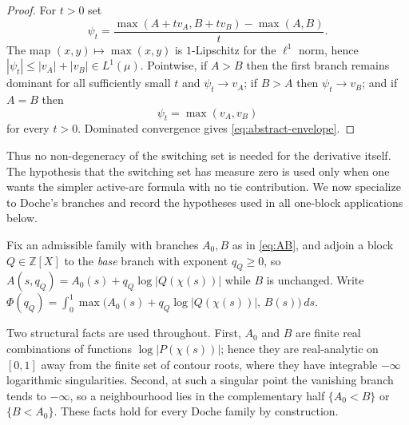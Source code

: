 \documentclass[11pt,reqno]{amsart}
\theoremstyle{plain}
\theoremstyle{definition}
\theoremstyle{remark}
\newcommand{\Z}{\mathbb{Z}}
\begin{document}
\begin{proof}
For $t>0$ set
\[
  \psi_t=\frac{\max(A+t v_A,B+t v_B)-\max(A,B)}{t}.
\]
The map $(x,y)\mapsto\max(x,y)$ is $1$-Lipschitz for the $\ell^1$ norm, hence
$|\psi_t|\le |v_A|+|v_B|\in L^1(\mu)$.  Pointwise, if $A>B$ then the first branch
remains dominant for all sufficiently small $t$ and $\psi_t\to v_A$; if $B>A$ then
$\psi_t\to v_B$; and if $A=B$ then
\[
  \psi_t=\max(v_A,v_B)
\]
for every $t>0$.  Dominated convergence gives \eqref{eq:abstract-envelope}.
\end{proof}

Thus no non-degeneracy of the switching set is needed for the derivative itself.  The
hypothesis that the switching set has measure zero is used only when one wants the
simpler active-arc formula with no tie contribution.  We now specialize to Doche's
branches and record the hypotheses used in all one-block applications below.

Fix an admissible family with branches $A_0,B$ as in \eqref{eq:AB}, and adjoin a
block $Q\in\Z[X]$ to the \emph{base} branch with exponent $q_Q\ge0$, so
$A(s,q_Q)=A_0(s)+q_Q\log|Q(\chi(s))|$ while $B$ is unchanged. Write
$\Phi(q_Q)=\int_0^1\max\bigl(A_0(s)+q_Q\log|Q(\chi(s))|,\,B(s)\bigr)\,ds$.

Two structural facts are used throughout.  First, $A_0$ and $B$ are finite real
combinations of functions $\log|P(\chi(s))|$; hence they are real-analytic on
$[0,1]$ away from the finite set of contour roots, where they have integrable
$-\infty$ logarithmic singularities.  Second, at such a singular point the vanishing
branch tends to $-\infty$, so a neighbourhood lies in the complementary half
$\{A_0<B\}$ or $\{B<A_0\}$.  These facts hold for every Doche family by construction. 
\end{document}
